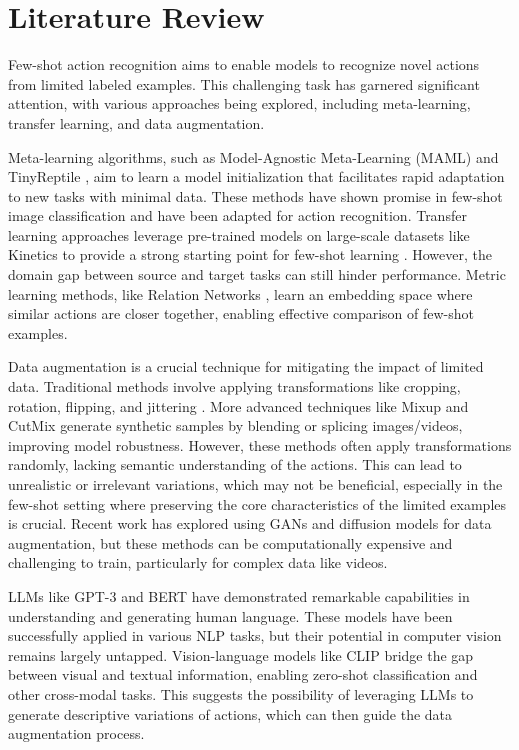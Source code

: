 \section*{Literature Review}

Few-shot action recognition aims to enable models to recognize novel actions from limited labeled examples. This challenging task has garnered significant attention, with various approaches being explored, including meta-learning, transfer learning, and data augmentation. \newline

Meta-learning algorithms, such as Model-Agnostic Meta-Learning (MAML) \cite{finn2017model} and TinyReptile \cite{ren2023tinyreptile}, aim to learn a model initialization that facilitates rapid adaptation to new tasks with minimal data. These methods have shown promise in few-shot image classification \cite{chen2024few} and have been adapted for action recognition. Transfer learning approaches leverage pre-trained models on large-scale datasets like Kinetics \cite{kay2017kinetics} to provide a strong starting point for few-shot learning \cite{brown2020language}. However, the domain gap between source and target tasks can still hinder performance. Metric learning methods, like Relation Networks \cite{sung2018learning}, learn an embedding space where similar actions are closer together, enabling effective comparison of few-shot examples.\newline

Data augmentation is a crucial technique for mitigating the impact of limited data. Traditional methods involve applying transformations like cropping, rotation, flipping, and jittering \cite{cai2021jitter}. More advanced techniques like Mixup \cite{zhang2017mixup} and CutMix \cite{yun2019cutmix} generate synthetic samples by blending or splicing images/videos, improving model robustness. However, these methods often apply transformations randomly, lacking semantic understanding of the actions. This can lead to unrealistic or irrelevant variations, which may not be beneficial, especially in the few-shot setting where preserving the core characteristics of the limited examples is crucial. Recent work has explored using GANs \cite{goodfellow2014generative} and diffusion models \cite{chen2024overview} for data augmentation, but these methods can be computationally expensive and challenging to train, particularly for complex data like videos.\newline

LLMs like GPT-3 \cite{radford2021learning} and BERT \cite{devlin2018bert} have demonstrated remarkable capabilities in understanding and generating human language. These models have been successfully applied in various NLP tasks, but their potential in computer vision remains largely untapped. Vision-language models like CLIP \cite{radford2021learning} bridge the gap between visual and textual information, enabling zero-shot classification and other cross-modal tasks. This suggests the possibility of leveraging LLMs to generate descriptive variations of actions, which can then guide the data augmentation process.\newline

